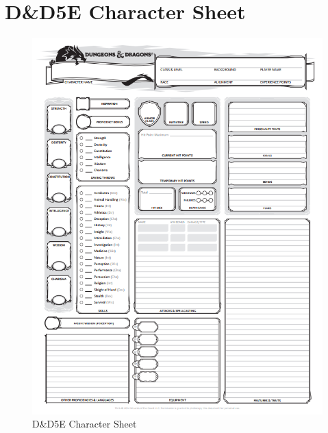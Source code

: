 \documentclass{article}
\begin{document}
\section{D\&D5E Character Sheet}
\begin{figure}
	\centering
	\includegraphics{character-sheet.png}
	\caption{D\&D5E Character Sheet}
	\label{fig:appa}
\end{figure}
\end{document}
